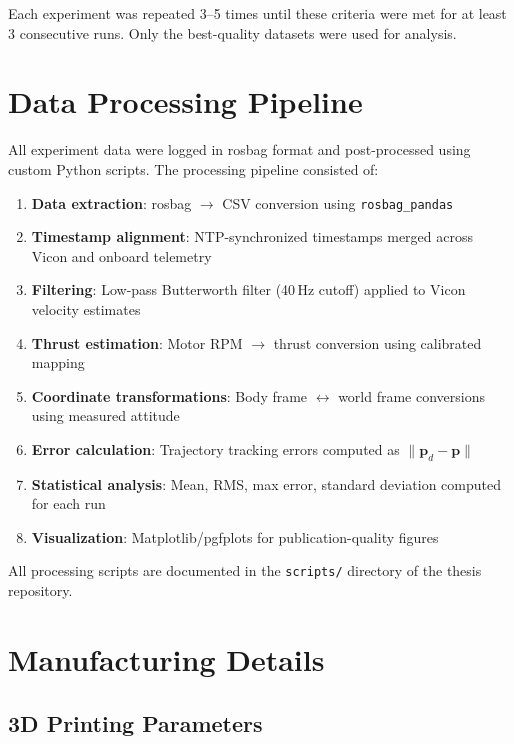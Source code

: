 Each experiment was repeated 3--5 times until these criteria were met for at least 3 consecutive runs. Only the best-quality datasets were used for analysis.

\section{Data Processing Pipeline}\label{sec:data-processing}

All experiment data were logged in rosbag format and post-processed using custom Python scripts. The processing pipeline consisted of:

\begin{enumerate}
\item \textbf{Data extraction}: rosbag $\rightarrow$ CSV conversion using \texttt{rosbag\_pandas}
\item \textbf{Timestamp alignment}: NTP-synchronized timestamps merged across Vicon and onboard telemetry
\item \textbf{Filtering}: Low-pass Butterworth filter (40\,Hz cutoff) applied to Vicon velocity estimates
\item \textbf{Thrust estimation}: Motor RPM $\rightarrow$ thrust conversion using calibrated mapping
\item \textbf{Coordinate transformations}: Body frame $\leftrightarrow$ world frame conversions using measured attitude
\item \textbf{Error calculation}: Trajectory tracking errors computed as $\|\mathbf{p}_d - \mathbf{p}\|$
\item \textbf{Statistical analysis}: Mean, RMS, max error, standard deviation computed for each run
\item \textbf{Visualization}: Matplotlib/pgfplots for publication-quality figures
\end{enumerate}

All processing scripts are documented in the \texttt{scripts/} directory of the thesis repository.

\section{Manufacturing Details}\label{sec:manufacturing}

\subsection{3D Printing Parameters}

